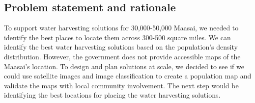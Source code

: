 \documentclass{article}
\begin{document}
\subsection{Problem statement and rationale}


To support water harvesting solutions for 30,000-50,000 Maasai, we needed to identify the best places to locate them across 300-500 square miles. We can identify the best water harvesting solutions based on the population's density distribution. However, the government does not provide accessible maps of the Maasai's location. To design and plan solutions at scale, we decided to see if we could use satellite images and image classification to create a population map and validate the maps with local community involvement. The next step would be identifying the best locations for placing the water harvesting solutions.





\end{document}
